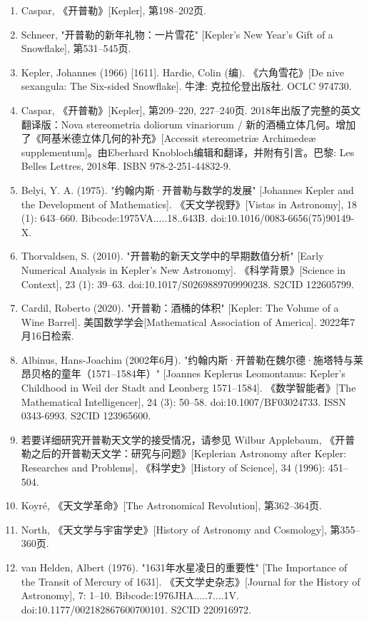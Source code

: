 \begin{enumerate}
\item Caspar, 《开普勒》[Kepler], 第198–202页.
\item Schneer, "开普勒的新年礼物：一片雪花" [Kepler's New Year's Gift of a Snowflake], 第531–545页.
\item Kepler, Johannes (1966) [1611]. Hardie, Colin (编). 《六角雪花》[De nive sexangula: The Six-sided Snowflake]. 牛津: 克拉伦登出版社. OCLC 974730.
\item Caspar, 《开普勒》[Kepler], 第209–220, 227–240页. 2018年出版了完整的英文翻译版：Nova stereometria doliorum vinariorum / 新的酒桶立体几何。增加了《阿基米德立体几何的补充》[Accessit stereometriæ Archimedeæ supplementum]。由Eberhard Knobloch编辑和翻译，并附有引言。巴黎: Les Belles Lettres, 2018年. ISBN 978-2-251-44832-9.
\item Belyi, Y. A. (1975). "约翰内斯·开普勒与数学的发展" [Johannes Kepler and the Development of Mathematics]. 《天文学视野》[Vistas in Astronomy], 18 (1): 643–660. Bibcode:1975VA.....18..643B. doi:10.1016/0083-6656(75)90149-X.
\item Thorvaldsen, S. (2010). "开普勒的新天文学中的早期数值分析" [Early Numerical Analysis in Kepler's New Astronomy]. 《科学背景》[Science in Context], 23 (1): 39–63. doi:10.1017/S0269889709990238. S2CID 122605799.
\item Cardil, Roberto (2020). "开普勒：酒桶的体积" [Kepler: The Volume of a Wine Barrel]. 美国数学学会[Mathematical Association of America]. 2022年7月16日检索.
\item Albinus, Hans-Joachim (2002年6月). "约翰内斯·开普勒在魏尔德·施塔特与莱昂贝格的童年（1571–1584年）" [Joannes Keplerus Leomontanus: Kepler's Childhood in Weil der Stadt and Leonberg 1571–1584]. 《数学智能者》[The Mathematical Intelligencer], 24 (3): 50–58. doi:10.1007/BF03024733. ISSN 0343-6993. S2CID 123965600.
\item 若要详细研究开普勒天文学的接受情况，请参见 Wilbur Applebaum, 《开普勒之后的开普勒天文学：研究与问题》[Keplerian Astronomy after Kepler: Researches and Problems], 《科学史》[History of Science], 34 (1996): 451–504.
\item Koyré, 《天文学革命》[The Astronomical Revolution], 第362–364页.
\item North, 《天文学与宇宙学史》[History of Astronomy and Cosmology], 第355–360页.
\item van Helden, Albert (1976). "1631年水星凌日的重要性" [The Importance of the Transit of Mercury of 1631]. 《天文学史杂志》[Journal for the History of Astronomy], 7: 1–10. Bibcode:1976JHA.....7....1V. doi:10.1177/002182867600700101. S2CID 220916972.

\end{enumerate}

